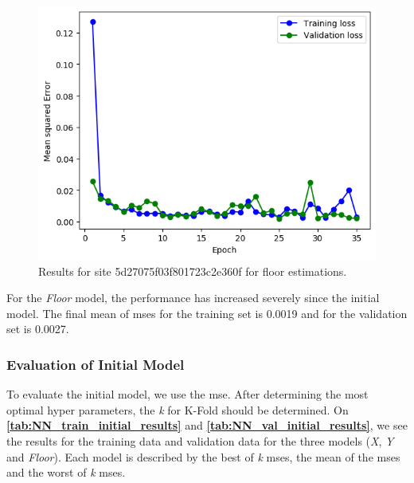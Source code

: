 \begin{figure}[H]
    \centering
    \includegraphics[scale=0.5]{Images/Experiments/NN/1.initial/exp4_floor_5d27075f03f801723c2e360f.png}
    \caption{Results for site 5d27075f03f801723c2e360f for floor estimations.}
    \label{fig:exp4_floor}
\end{figure}

For the \textit{Floor} model, the performance has increased severely since the initial model. The final mean of \gls{mse}s for the training set is 0.0019 and for the validation set is 0.0027.


\subsubsection{Evaluation of Initial Model}
To evaluate the initial model, we use the \gls{mse}. After determining the most optimal hyper parameters, the \textit{k} for K-Fold should be determined. On \textbf{\autoref{tab:NN_train_initial_results}} and \textbf{\autoref{tab:NN_val_initial_results}}, we see the results for the training data and validation data for the three models (\textit{X}, \textit{Y} and \textit{Floor}). Each model is described by the best of \textit{k} \gls{mse}s, the mean of the \gls{mse}s and the worst of \textit{k} \gls{mse}s.

